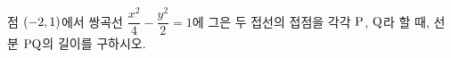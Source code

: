 점 $(-2{,}\mkern3mu\mathopen{}1)$에서 쌍곡선 $\dfrac{x^2}{4}-\dfrac{y^2}{2}=1$에 그은 두 접선의 접점을 각각 $\mathrm{P}$, $\mathrm{Q}$라 할 때, 선분 $\mathrm{PQ}$의 길이를 구하시오.
